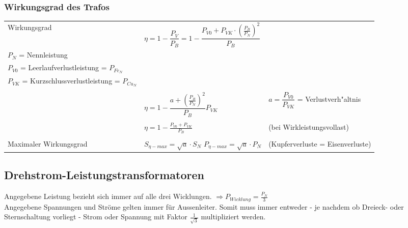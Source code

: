 		\subsubsection{Wirkungsgrad des Trafos}
			\begin{tabular}{p{4.5cm}p{7cm}p{7.5cm}}
            	Wirkungsgrad &
            		$\eta = 1- \dfrac{P_V}{P_B} = 1-\dfrac{P_{V0} + P_{VK} \cdot
            		(\frac{P_B}{P_N})^2}{P_B} $ &
            	\begin{minipage}{7cm}
                	$P_B$ = Betriebsnennleistung = $P_1$ = $S_1 \cdot \cos \varphi$\\
                	$P_{N}$ = Nennleistung\\
                	$P_{V0}$ = Leerlaufverlustleistung = $P_{{Fe}_N}$\\
                	$P_{VK}$ = Kurzschlussverlustleistung = $P_{{Cu}_N}$             	
                \end{minipage}\\ \\
            	 &
            		$\eta = 1 - \dfrac{a + (\frac{P_B}{P_N})^2}{P_B} P_{VK}$ &
            	\begin{minipage}{7cm}
 					$a = \dfrac{P_{V0}}{P_{VK}}$ = Verlustverh"altnis                	
                \end{minipage}\\ \\            		
            	 &
            		$\eta = 1 - \frac{P_{V0}+P_{VK}}{P_B} $ 
            		& (bei Wirkleistungsvollast) \\ \\
            	Maximaler Wirkungsgrad
            	& $S_{\eta-max} = \sqrt{a} \cdot S_N$ \quad $P_{\eta-max} = \sqrt{a}
            	\cdot P_N$
            	& (Kupferverluste = Eisenverluste)
            \end{tabular}	

	\subsection{Drehstrom-Leistungstransformatoren} 
	Angegebene Leistung bezieht sich immer auf alle drei Wicklungen. $\Rightarrow P_{Wicklung} =
	\frac{P_N}{3}$ \\
	Angegebene Spannungen und Str\"ome gelten immer für Aussenleiter. Somit muss immer entweder - je
 nachdem ob Dreieck- oder Sternschaltung vorliegt -	Strom oder Spannung mit Faktor
 $\frac{1}{\sqrt{3}}$ multipliziert werden.
